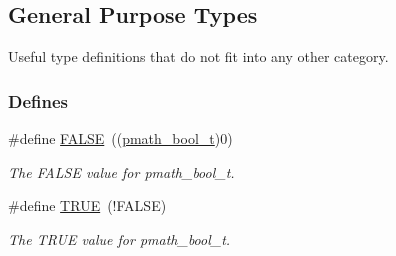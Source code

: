 \hypertarget{group__general__types}{
\subsection{General Purpose Types}
\label{group__general__types}
}
Useful type definitions that do not fit into any other category.  


\subsubsection*{Defines}
\begin{CompactItemize}
\item 
\hypertarget{group__general__types_ga93f0eb578d23995850d61f7d61c55c1}{
\#define \hyperlink{group__general__types_ga93f0eb578d23995850d61f7d61c55c1}{FALSE}~((\hyperlink{group__general__types_gc92090cb0b56345d6c379ed2341d4ef4}{pmath\_\-bool\_\-t})0)}
\label{group__general__types_ga93f0eb578d23995850d61f7d61c55c1}

\begin{CompactList}\small\item\em The FALSE value for pmath\_\-bool\_\-t. \item\end{CompactList}\item 
\hypertarget{group__general__types_ga8cecfc5c5c054d2875c03e77b7be15d}{
\#define \hyperlink{group__general__types_ga8cecfc5c5c054d2875c03e77b7be15d}{TRUE}~(!FALSE)}
\label{group__general__types_ga8cecfc5c5c054d2875c03e77b7be15d}

\begin{CompactList}\small\item\em The TRUE value for pmath\_\-bool\_\-t. \item\end{CompactList}\end{CompactItemize}
